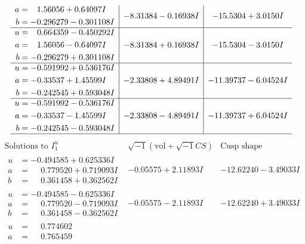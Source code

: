 \documentclass[1p]{elsarticle_modified}
\theoremstyle{definition}
\newcommand{\I}{\sqrt{-1}}
\begin{document}
$$\begin{array}{c|c|c}
\begin{aligned}
a &= \phantom{-}1.56056 + 0.64097 I \\
b &= -0.296279 - 0.301108 I\end{aligned}
 & -8.31384 - 0.16938 I & -15.5304 + 3.0150 I \\ \hline\begin{aligned}
u &= \phantom{-}0.664359 - 0.450292 I \\
a &= \phantom{-}1.56056 - 0.64097 I \\
b &= -0.296279 + 0.301108 I\end{aligned}
 & -8.31384 + 0.16938 I & -15.5304 - 3.0150 I \\ \hline\begin{aligned}
u &= -0.591992 + 0.536176 I \\
a &= -0.33537 + 1.45599 I \\
b &= -0.242545 + 0.593048 I\end{aligned}
 & -2.33808 + 4.89491 I & -11.39737 - 6.04524 I \\ \hline\begin{aligned}
u &= -0.591992 - 0.536176 I \\
a &= -0.33537 - 1.45599 I \\
b &= -0.242545 - 0.593048 I\end{aligned}
 & -2.33808 - 4.89491 I & -11.39737 + 6.04524 I\\
 \hline 
 \end{array}$$\newpage$$\begin{array}{c|c|c}  
\text{Solutions to }I^u_{1}& \I (\text{vol} + \sqrt{-1}CS) & \text{Cusp shape}\\
 \hline 
\begin{aligned}
u &= -0.494585 + 0.625336 I \\
a &= \phantom{-}0.779520 + 0.719093 I \\
b &= \phantom{-}0.361458 + 0.362562 I\end{aligned}
 & -0.05575 + 2.11893 I & -12.62240 - 3.49033 I \\ \hline\begin{aligned}
u &= -0.494585 - 0.625336 I \\
a &= \phantom{-}0.779520 - 0.719093 I \\
b &= \phantom{-}0.361458 - 0.362562 I\end{aligned}
 & -0.05575 - 2.11893 I & -12.62240 + 3.49033 I \\ \hline\begin{aligned}
u &= \phantom{-}0.774602\phantom{ +0.000000I} \\
a &= \phantom{-}0.765459\phantom{ +0.000000I} \\

\end{aligned}
\end{array}$$
\end{document}
